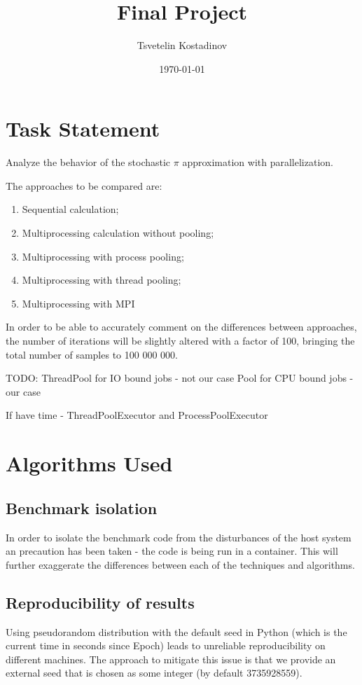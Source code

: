 \documentclass[a4paper, oneside]{article}
\title{Final Project}
\date{\today}
\author{Tsvetelin Kostadinov}
\begin{document}

\tableofcontents
\listoffigures
\listoftables
\newpage
\section{Task Statement}
Analyze the behavior of the stochastic $\pi$ approximation with parallelization.

The approaches to be compared are:
\begin{enumerate}
    \item Sequential calculation;
    \item Multiprocessing calculation without pooling;
    \item Multiprocessing with process pooling;
    \item Multiprocessing with thread pooling;
    \item Multiprocessing with MPI
\end{enumerate}

In order to be able to accurately comment on the differences between approaches, the number of iterations will be slightly altered with a factor of 100, bringing the total number of samples to 100 000 000.

TODO:
ThreadPool for IO bound jobs - not our case
Pool for CPU bound jobs - our case

If have time - ThreadPoolExecutor and ProcessPoolExecutor

\section{Algorithms Used}
\subsection{Benchmark isolation}
In order to isolate the benchmark code from the disturbances of the host system an precaution has been taken - the code is being run in a container. This will further exaggerate the differences between each of the techniques and algorithms.

\subsection{Reproducibility of results}
Using pseudorandom distribution with the default seed in Python (which is the current time in seconds since Epoch) leads to unreliable reproducibility on different machines. The approach to mitigate this issue is that we provide an external seed that is chosen as some integer (by default 3735928559).
\end{document}
